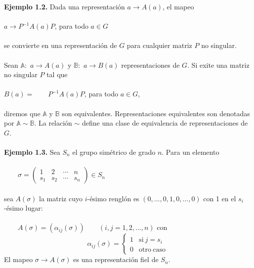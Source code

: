 \documentclass[12pt]{book}
\theoremstyle{definition}
\newcounter{in}
\begin{document}
\textbf{Ejemplo 1.2.} Dada una representación $a \rightarrow A\left(a\right)$, el mapeo\\~\\
$a \rightarrow P^{-1}A\left(a\right)P$, para todo $a \in G$\\~\\
se convierte en una representación de $G$ para cualquier matriz $P$ no singular.\\~\\
Sean $\mathbb{A}:$ $a\rightarrow A\left(a\right)$ y $\mathbb{B}:$ $a\rightarrow B\left(a\right)$ representaciones de $G$. Si exite una matriz no singular $P$ tal que \\~\\
$B\left(a\right)=\qquad P^{-1}A\left(a\right)P$, para todo $a \in G$,\\~\\
diremos que $\mathbb{A}$ y $\mathbb{B}$ son equivalentes. Representaciones equivalentes son denotadas por $\mathbb{A} \sim \mathbb{B}$. La relación $\sim$ define una clase de equivalencia de representaciones de $G$.\\~\\
\textbf{Ejemplo 1.3.} Sea $S_{n}$ el grupo simétrico de grado $n$. Para un elemento\\~\\
$\qquad 
\sigma = 
\begin{pmatrix}
1 & 2 & \cdots  & n\\ 
s_{1} & s_{2} & \cdots & s_{n}
\end{pmatrix} 
\in S_{n}$\\~\\
sea $A\left(\sigma\right)$ la matriz cuyo $i$-ésimo renglón es $\left(0,...,0,1,0,...,0\right)$ con 1 en el $s_{i}$-ésimo lugar:\\~\\
$\qquad
A\left(\sigma\right) = \left(\alpha_{ij}\left(\sigma\right)\right) 
\qquad
\left(i,j=1,2,...,n\right)
$
con
\begin{equation*}
         \alpha_{ij}\left(\sigma\right) = \left\{
	       \begin{array}{ll}
		 1      & \mathrm{si\ } j = s_{i} \\
		 0      & \mathrm{otro\ caso\ } 
	       \end{array}
	     \right.
\end{equation*}
El mapeo $\sigma \rightarrow A\left(\sigma\right)$ es una representación fiel de $S_{n}$.\\~\\
\end{document}
